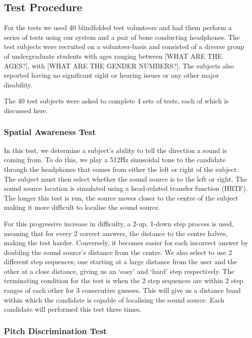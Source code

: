 \documentclass[format=sigconf, review=true, screen=true, anonymous=true]{acmart}
\begin{document}
\subsection{Test Procedure}

For the tests we used 40 blindfolded test volunteers and had them perform a series of tests using our system and a pair of bone conducting headphones. The test subjects were recruited on a volunteer-basis and consisted of a diverse group of undergraduate students with ages ranging between [WHAT ARE THE AGES?], with [WHAT ARE THE GENDER NUMBERS?]. The subjects also reported having no significant sight or hearing issues or any other major disability. 

The 40 test subjects were asked to complete 4 sets of tests, each of which is discussed here.

\subsubsection{Spatial Awareness Test}

In this test, we determine a subject's ability to tell the direction a sound is coming from. To do this, we play a 512Hz sinusoidal tone to the candidate through the headphones that comes from either the left or right of the subject. The subject must then select whether the sound source is to the left or right. The sound source location is simulated using a head-related transfer function (HRTF). The longer this test is run, the source moves closer to the centre of the subject making it more difficult to localise the sound source. 

For this progressive increase in difficulty, a 2-up, 1-down step process is used, meaning that for every 2 correct answers, the distance to the centre halves, making the test harder. Conversely, it becomes easier for each incorrect answer by doubling the sound source's distance from the centre. We also select to use 2 different step sequences, one starting at a large distance from the user and the other at a close distance, giving us an `easy' and `hard' step respectively. The terminating condition for the test is when the 2 step sequences are within 2 step ranges of each other for 3 consecutive guesses. This will give us a distance band within which the candidate is capable of localising the sound source. Each candidate will performed this test three times. 

\subsubsection{Pitch Discrimination Test}
\end{document}
